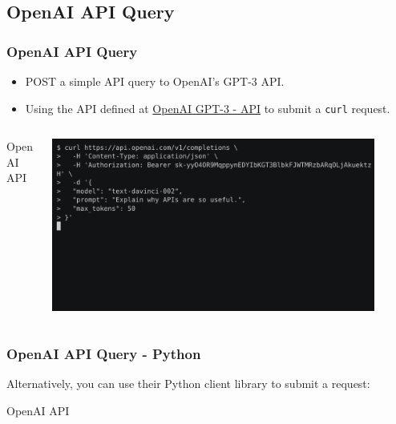 \documentclass[t]{beamer}
\begin{document}
\subsection{OpenAI API Query}
\begin{frame}[fragile=singleslide]
  \frametitle{OpenAI API Query}

  \begin{itemize}
  \item POST a simple API query to OpenAI's GPT-3 API.
  \item Using the API defined at \href{https://beta.openai.com/docs/api-reference/completions/create?lang=curl}{OpenAI GPT-3 - API} to submit a \texttt{curl} request.
  \end{itemize}

  \begin{columns}[T]
    \begin{column}{.5\textwidth}
      \begin{exampleblock}{OpenAI API}
        \inputminted[fontsize=\footnotesize]{python}{code/openai_api.sh}
      \end{exampleblock}
    \end{column}

    \begin{column}{.5\textwidth}
      \centering
      \vspace{12pt}
      \href{https://asciinema.org/a/537661}{\includegraphics[width=0.9\textwidth]{figures/api-prompt.png}}
    \end{column}
  \end{columns}

\end{frame}

\begin{frame}[fragile=singleslide]
  \frametitle{OpenAI API Query - Python}

  Alternatively, you can use their Python client library to submit a request:

  \begin{exampleblock}{OpenAI API}
    \inputminted[fontsize=\footnotesize]{python}{code/openai_api.py}
  \end{exampleblock}
\end{frame}
\end{document}
